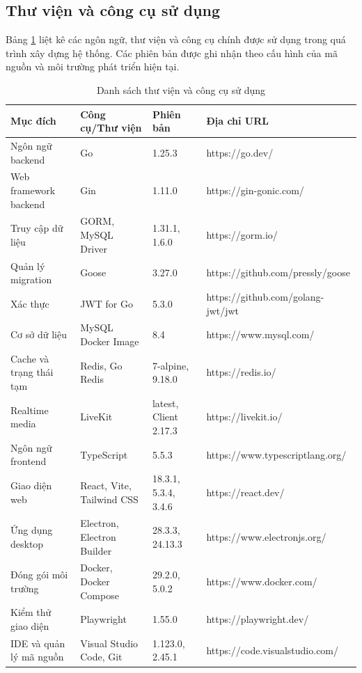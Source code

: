 \subsection{Thư viện và công cụ sử dụng}
\label{subsection:4.3.1}

Bảng \ref{tab:4-6-danh-sach-cong-cu-thu-vien} liệt kê các ngôn ngữ, thư viện và công cụ chính được sử dụng trong quá trình xây dựng hệ thống. Các phiên bản được ghi nhận theo cấu hình của mã nguồn và môi trường phát triển hiện tại.

\begin{table}[H]
    \centering
    \caption{Danh sách thư viện và công cụ sử dụng}
    \label{tab:4-6-danh-sach-cong-cu-thu-vien}
    \small
    \begin{tabular}{|p{}|p{}|p{}|p{}|}
        \hline
        \textbf{Mục đích} & \textbf{Công cụ/Thư viện} & \textbf{Phiên bản} & \textbf{Địa chỉ URL} \\ \hline
        Ngôn ngữ backend & Go & 1.25.3 & https://go.dev/ \\ \hline
        Web framework backend & Gin & 1.11.0 & https://gin-gonic.com/ \\ \hline
        Truy cập dữ liệu & GORM, MySQL Driver & 1.31.1, 1.6.0 & https://gorm.io/ \\ \hline
        Quản lý migration & Goose & 3.27.0 & https://github.com/pressly/goose \\ \hline
        Xác thực & JWT for Go & 5.3.0 & https://github.com/golang-jwt/jwt \\ \hline
        Cơ sở dữ liệu & MySQL Docker Image & 8.4 & https://www.mysql.com/ \\ \hline
        Cache và trạng thái tạm & Redis, Go Redis & 7-alpine, 9.18.0 & https://redis.io/ \\ \hline
        Realtime media & LiveKit & latest, Client 2.17.3 & https://livekit.io/ \\ \hline
        Ngôn ngữ frontend & TypeScript & 5.5.3 & https://www.typescriptlang.org/ \\ \hline
        Giao diện web & React, Vite, Tailwind CSS & 18.3.1, 5.3.4, 3.4.6 & https://react.dev/ \\ \hline
        Ứng dụng desktop & Electron, Electron Builder & 28.3.3, 24.13.3 & https://www.electronjs.org/ \\ \hline
        Đóng gói môi trường & Docker, Docker Compose & 29.2.0, 5.0.2 & https://www.docker.com/ \\ \hline
        Kiểm thử giao diện & Playwright & 1.55.0 & https://playwright.dev/ \\ \hline
        IDE và quản lý mã nguồn & Visual Studio Code, Git & 1.123.0, 2.45.1 & https://code.visualstudio.com/ \\ \hline
    \end{tabular}
\end{table}

